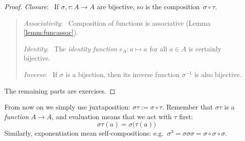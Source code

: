 \begin{proof}
	\exstart \emph{Closure}: \ If $\sigma,\tau:A\to A$ are bijective, so is the composition\footnotemark\ $\sigma\circ\tau$.\vspace{-5pt}
  \begin{quote}
		\emph{Associativity}: \ Composition of functions is associative (Lemma \ref{lemm:funcassoc}).\par
		\emph{Identity}: \ The \emph{identity function} $e_A:a\mapsto a$ for all $a\in A$ is certainly bijective.\par
		\emph{Inverse}: \ If $\sigma$ is a bijection, then its inverse function $\sigma^{-1}$ is also bijective.
	\end{quote}
		The remaining parts are exercises.
\end{proof}


From now on we simply use juxtaposition: $\sigma\tau:=\sigma\circ\tau$. Remember that $\sigma\tau$ is a \emph{function} $A\to A$, and evaluation means that we act with $\tau$ first:
\[
	\sigma\tau(a)=\sigma\bigl(\tau(a)\bigr)
\]
Similarly, exponentiation mean self-compositions: e.g.\ $\sigma^3=\sigma\sigma\sigma=\sigma\circ\sigma\circ\sigma$.

\goodbreak


